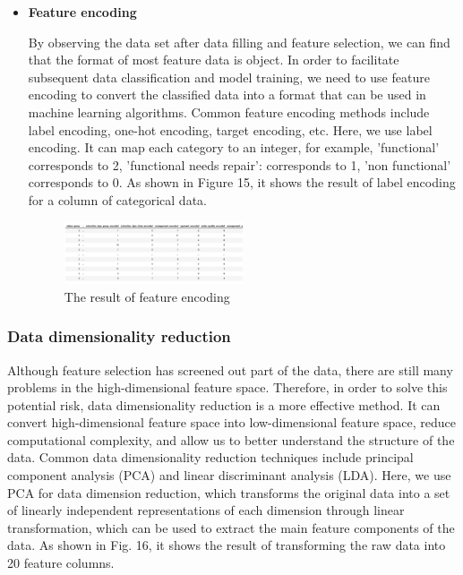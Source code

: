 \documentclass[conference]{IEEEtran}
\begin{document}
\begin{itemize}
\item \textbf{Feature encoding}

By observing the data set after data filling and feature selection, we can find that the format of most feature data is object. In order to facilitate subsequent data classification and model training, we need to use feature encoding to convert the classified data into a format that can be used in machine learning algorithms. Common feature encoding methods include label encoding, one-hot encoding, target encoding, etc. Here, we use label encoding. It can map each category to an integer, for example, 'functional' corresponds to 2, 'functional needs repair': corresponds to 1, 'non functional' corresponds to 0. As shown in Figure 15, it shows the result of label encoding for a column of categorical data.

\begin{figure}[H]
\centerline{\includegraphics[width=0.5\textwidth]{14.pic.jpg}}
\caption{The result of feature encoding}
\end{figure}
\end{itemize}

\subsubsection{Data dimensionality reduction}

Although feature selection has screened out part of the data, there are still many problems in the high-dimensional feature space. Therefore, in order to solve this potential risk, data dimensionality reduction is a more effective method. It can convert high-dimensional feature space into low-dimensional feature space, reduce computational complexity, and allow us to better understand the structure of the data. Common data dimensionality reduction techniques include principal component analysis (PCA) and linear discriminant analysis (LDA). Here, we use PCA for data dimension reduction, which transforms the original data into a set of linearly independent representations of each dimension through linear transformation, which can be used to extract the main feature components of the data. As shown in Fig. 16, it shows the result of transforming the raw data into 20 feature columns.
\end{document}

